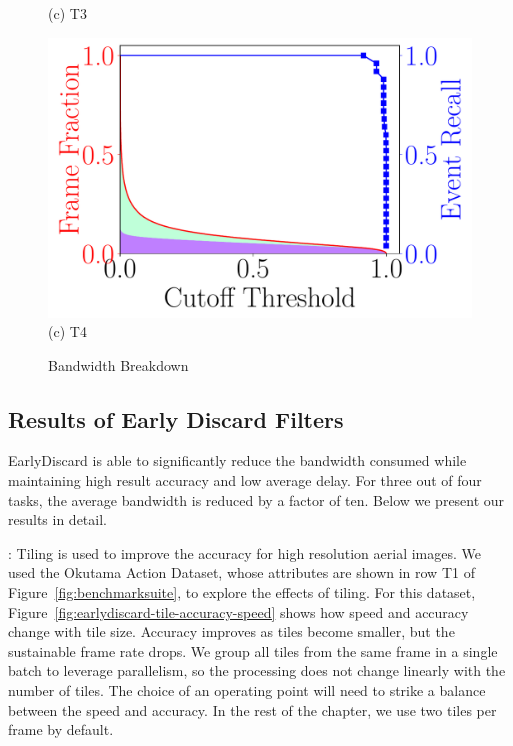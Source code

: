 \begin{figure}
\begin{minipage}[]{0.45\linewidth}
{(c) T3}
\end{minipage}
\begin{minipage}[]{0.45\linewidth}
\centering
    \includegraphics[width=\linewidth]{FIGS/fig-event-recall-frame-percentage-vs-threshold-elephant.pdf}\\
{(c) T4}
\end{minipage}
\caption{Bandwidth Breakdown}
\label{fig:earlydiscard-frame-percent-breakdown}
\end{figure}

\subsection{Results of Early Discard Filters}
\label{sec:earlydiscard-result}

EarlyDiscard is able to significantly reduce the bandwidth consumed while
maintaining high result accuracy and low average delay. For three out of four
tasks, the average bandwidth is reduced by a factor of ten. Below we present
our results in detail.

: Tiling is used to improve the accuracy
for high resolution aerial images. We used the Okutama Action Dataset, whose
attributes are shown in row T1 of Figure~\ref{fig:benchmarksuite}, to explore
the effects of tiling.  For this dataset,
Figure~\ref{fig:earlydiscard-tile-accuracy-speed} shows how speed and accuracy
change with tile size.  Accuracy improves as tiles become smaller, but the
sustainable frame rate drops.  We group all tiles from the same frame in a
single batch to leverage parallelism, so the processing does not change linearly
with the number of tiles. The choice of an operating point will need to strike a
balance between the speed and accuracy.  In the rest of the chapter, we use two
tiles per frame by default. 

